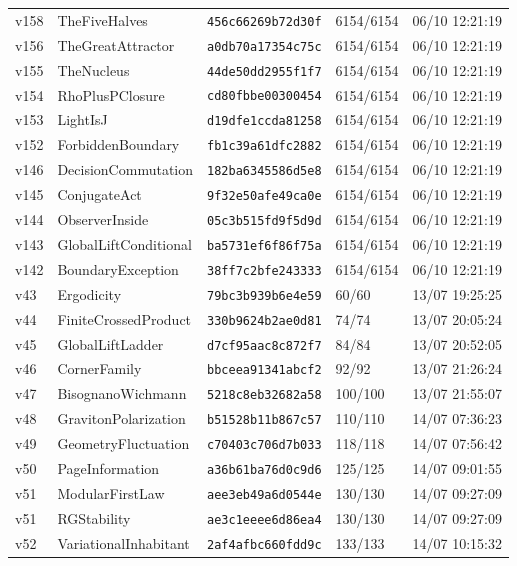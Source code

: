 \documentclass[11pt]{article}
\theoremstyle{definition}\newtheorem{deriv}{Derivation}
\begin{document}
{\begin{longtable}{@{}lllll@{}}
v158 & TheFiveHalves & \texttt{456c66269b72d30f} & 6154/6154 & 06/10 12:21:19 \\
v156 & TheGreatAttractor & \texttt{a0db70a17354c75c} & 6154/6154 & 06/10 12:21:19 \\
v155 & TheNucleus & \texttt{44de50dd2955f1f7} & 6154/6154 & 06/10 12:21:19 \\
v154 & RhoPlusPClosure & \texttt{cd80fbbe00300454} & 6154/6154 & 06/10 12:21:19 \\
v153 & LightIsJ & \texttt{d19dfe1ccda81258} & 6154/6154 & 06/10 12:21:19 \\
v152 & ForbiddenBoundary & \texttt{fb1c39a61dfc2882} & 6154/6154 & 06/10 12:21:19 \\
v146 & DecisionCommutation & \texttt{182ba6345586d5e8} & 6154/6154 & 06/10 12:21:19 \\
v145 & ConjugateAct & \texttt{9f32e50afe49ca0e} & 6154/6154 & 06/10 12:21:19 \\
v144 & ObserverInside & \texttt{05c3b515fd9f5d9d} & 6154/6154 & 06/10 12:21:19 \\
v143 & GlobalLiftConditional & \texttt{ba5731ef6f86f75a} & 6154/6154 & 06/10 12:21:19 \\
v142 & BoundaryException & \texttt{38ff7c2bfe243333} & 6154/6154 & 06/10 12:21:19 \\
v43 & Ergodicity & \texttt{79bc3b939b6e4e59} & 60/60 & 13/07 19:25:25 \\
v44 & FiniteCrossedProduct & \texttt{330b9624b2ae0d81} & 74/74 & 13/07 20:05:24 \\
v45 & GlobalLiftLadder & \texttt{d7cf95aac8c872f7} & 84/84 & 13/07 20:52:05 \\
v46 & CornerFamily & \texttt{bbceea91341abcf2} & 92/92 & 13/07 21:26:24 \\
v47 & BisognanoWichmann & \texttt{5218c8eb32682a58} & 100/100 & 13/07 21:55:07 \\
v48 & GravitonPolarization & \texttt{b51528b11b867c57} & 110/110 & 14/07 07:36:23 \\
v49 & GeometryFluctuation & \texttt{c70403c706d7b033} & 118/118 & 14/07 07:56:42 \\
v50 & PageInformation & \texttt{a36b61ba76d0c9d6} & 125/125 & 14/07 09:01:55 \\
v51 & ModularFirstLaw & \texttt{aee3eb49a6d0544e} & 130/130 & 14/07 09:27:09 \\
v51 & RGStability & \texttt{ae3c1eeee6d86ea4} & 130/130 & 14/07 09:27:09 \\
v52 & VariationalInhabitant & \texttt{2af4afbc660fdd9c} & 133/133 & 14/07 10:15:32 \\

\end{longtable}}
\end{document}
